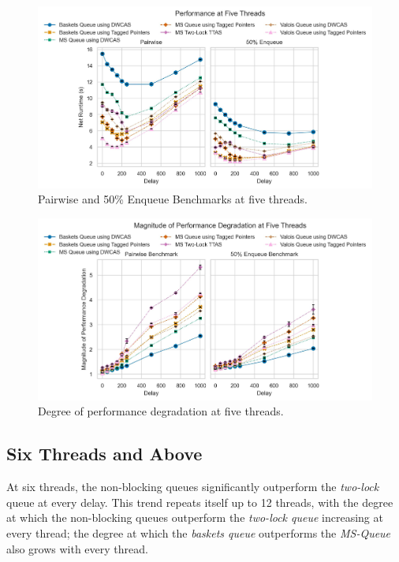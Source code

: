 \begin{figure}[!ht]
    \centering
    \includegraphics[width=1\textwidth]{images/plots/delay_thread_5.jpg}
    \caption{Pairwise and 50\% Enqueue Benchmarks at five threads.}
    \label{fig:perf_5_thread}
\end{figure}

\begin{figure}[!ht]
    \centering
    \includegraphics[width=1\textwidth]{images/plots/speedup_4.jpg}
    \caption{Degree of performance degradation at five threads.}
    \label{fig:perf_deg_5_thread}
\end{figure}

\subsection{Six Threads and Above}
At six threads, the non-blocking queues significantly outperform the \emph{two-lock}
queue at every delay. This trend repeats itself up to 12 threads, with the
degree at which the non-blocking queues outperform the \emph{two-lock queue}
increasing at every thread; the degree at which the \emph{baskets queue} outperforms
the \emph{MS-Queue} also grows with every thread.

